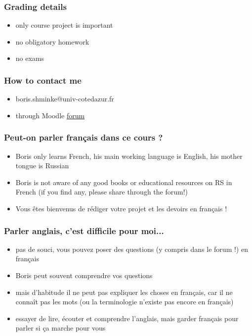 \documentclass[t]{beamer}
\begin{document}
\begin{frame}
  \frametitle{Grading details}
  \begin{itemize}
  \item only course project is important
  \item no obligatory homework
  \item no exams
  \end{itemize}
\end{frame}
\begin{frame}
  \frametitle{How to contact me}
  \begin{itemize}
  \item boris.shminke@univ-cotedazur.fr
  \item through Moodle \href{https://lms.univ-cotedazur.fr/2022/mod/forum/view.php?id=220784}{forum}
  \end{itemize}
\end{frame}
\begin{frame}
  \frametitle{Peut-on parler français dans ce cours ?}
  \begin{itemize}
  \item Boris only learns French, his main working language is English, his mother tongue is Russian
  \item Boris is not aware of any good books or educational resources on RS in French (if you find any, please share through the forum!)
  \item Vous êtes bienvenus de rédiger votre projet et les devoirs en français !
  \end{itemize}
\end{frame}
\begin{frame}
  \frametitle{Parler anglais, c'est difficile pour moi...}
  \begin{itemize}
  \item pas de souci, vous pouvez poser des questions (y compris dans le forum !) en français
  \item Boris peut souvent comprendre vos questions
  \item mais d'habitude il ne peut pas expliquer les choses en français, car il ne connaît pas les mots (ou la terminologie n'existe pas encore en français)
  \item essayer de lire, écouter et comprendre l'anglais, mais garder français pour parler si ça marche pour vous
  \end{itemize}
\end{frame}
\end{document}
